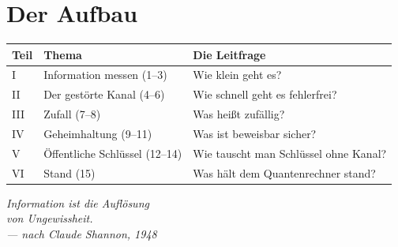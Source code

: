 \section*{Der Aufbau}

\begin{merksatz}
\begin{center}
{\small
\renewcommand{\arraystretch}{1.45}
\begin{tabular}{@{}P{1.0cm}P{3.2cm}P{4.4cm}@{}}
\toprule
\textbf{Teil} & \textbf{Thema} & \textbf{Die Leitfrage}\\
\midrule
I & Information messen (1--3) & Wie klein geht es?\\
II & Der gestörte Kanal (4--6) & Wie schnell geht es fehlerfrei?\\
III & Zufall (7--8) & Was heißt zufällig?\\
IV & Geheimhaltung (9--11) & Was ist beweisbar sicher?\\
V & Öffentliche Schlüssel (12--14) & Wie tauscht man Schlüssel ohne Kanal?\\
VI & Stand (15) & Was hält dem Quantenrechner stand?\\
\bottomrule
\end{tabular}}
\end{center}
\end{merksatz}

\vspace{10pt}
\begin{flushright}
\itshape\color{grau}
Information ist die Auflösung\\
von Ungewissheit.\\[8pt]
\normalfont\color{grau}\upshape --- nach Claude Shannon, 1948
\end{flushright}
